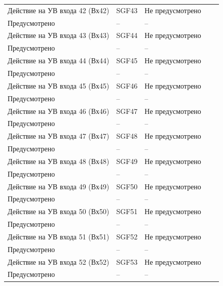 \begin{longtable}{|>{\centering\arraybackslash}m{5.3cm}|>{\centering\arraybackslash}m{3.3cm}|>{\centering\arraybackslash}m{4.2cm}|>{\centering\arraybackslash}m{1.8cm}|>{\centering\arraybackslash}m{1cm}|}
\hline
\centering Действие на УВ входа 42 (Вх42)  & \centering SGF43 & \centering Не предусмотрено \\ Предусмотрено & \centering -- & \centering \arraybackslash -- \\
\hline
\centering Действие на УВ входа 43 (Вх43)  & \centering SGF44 & \centering Не предусмотрено \\ Предусмотрено & \centering -- & \centering \arraybackslash -- \\
\hline
\centering Действие на УВ входа 44 (Вх44)  & \centering SGF45 & \centering Не предусмотрено \\ Предусмотрено & \centering -- & \centering \arraybackslash -- \\
\hline
\centering Действие на УВ входа 45 (Вх45)  & \centering SGF46 & \centering Не предусмотрено \\ Предусмотрено & \centering -- & \centering \arraybackslash -- \\
\hline
\centering Действие на УВ входа 46 (Вх46)  & \centering SGF47 & \centering Не предусмотрено \\ Предусмотрено & \centering -- & \centering \arraybackslash -- \\
\hline
\centering Действие на УВ входа 47 (Вх47)  & \centering SGF48 & \centering Не предусмотрено \\ Предусмотрено & \centering -- & \centering \arraybackslash -- \\
\hline
\centering Действие на УВ входа 48 (Вх48)  & \centering SGF49 & \centering Не предусмотрено \\ Предусмотрено & \centering -- & \centering \arraybackslash -- \\
\hline
\centering Действие на УВ входа 49 (Вх49)  & \centering SGF50 & \centering Не предусмотрено \\ Предусмотрено & \centering -- & \centering \arraybackslash -- \\
\hline
\centering Действие на УВ входа 50 (Вх50)  & \centering SGF51 & \centering Не предусмотрено \\ Предусмотрено & \centering -- & \centering \arraybackslash -- \\
\hline
\centering Действие на УВ входа 51 (Вх51)  & \centering SGF52 & \centering Не предусмотрено \\ Предусмотрено & \centering -- & \centering \arraybackslash -- \\
\hline
\centering Действие на УВ входа 52 (Вх52)  & \centering SGF53 & \centering Не предусмотрено \\ Предусмотрено & \centering -- & \centering \arraybackslash -- \\

\end{longtable}

